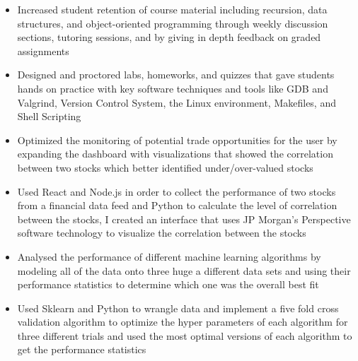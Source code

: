 \documentclass[10pt,a4paper,ragged2e,withhyper]{altacv}
\begin{document}
\begin{paracol}{2}

\begin{itemize}
\item Increased student retention of course material including recursion, data structures, and object-oriented programming through weekly discussion sections, tutoring sessions, and by giving in depth feedback on graded assignments

\item Designed and proctored labs, homeworks, and quizzes that gave students hands on practice with key software techniques and tools like GDB and Valgrind, Version Control System, the Linux environment, Makefiles, and Shell Scripting 

\end{itemize}

\divider

\begin{itemize}
\item Optimized the monitoring of potential trade opportunities for the user by expanding the dashboard with visualizations that showed the correlation between two stocks which better identified under/over-valued stocks

\item Used React and Node.js in order to collect the performance of two stocks from a financial data feed and Python to calculate the level of correlation between the stocks, I created an interface that uses  JP Morgan’s Perspective software technology to visualize the correlation between the stocks

\end{itemize}


\begin{itemize}
\item Analysed the performance of different machine learning algorithms by modeling all of the data
onto three huge a different data sets and using their performance statistics to determine which one
was the overall best fit
\item Used Sklearn and Python to wrangle data and implement a five fold cross validation algorithm to optimize the hyper parameters of each algorithm for three different trials and used the most optimal versions of each algorithm to get the performance statistics
\end{itemize}


\end{paracol}
\end{document}
